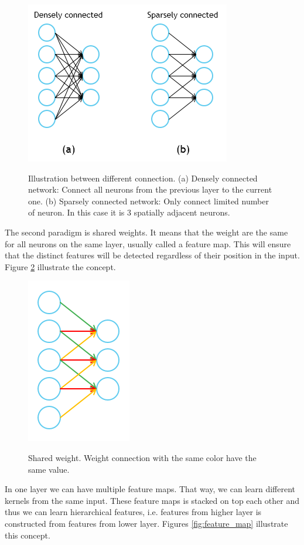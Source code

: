 \documentclass[a4paper,11pt]{kth-mag}
\begin{document}
\begin{figure}[h]
\centering
\includegraphics[scale=0.5]{image/sparse.png}
\label{fig:sparse}
\caption{Illustration between different connection. (a) Densely connected network: Connect all neurons from the previous layer to the current one. (b) Sparsely connected network: Only connect limited number of neuron. In this case it is 3 spatially adjacent neurons.}
\end{figure}

The second paradigm is shared weights. It means that the weight are the same for all neurons on the same layer, usually called a feature map. This will ensure that the distinct features will be detected regardless of their position in the input. Figure \ref{fig:shared} illustrate the concept. 

\begin{figure}
\centering
\includegraphics[scale=0.5]{image/shared.png}
\label{fig:shared}
\caption{Shared weight. Weight connection with the same color have the same value.}
\end{figure}

In one layer we can have multiple feature maps. That way, we can learn different kernels from the same input. These feature maps is stacked on top each other and thus we can learn hierarchical features, i.e. features from higher layer is constructed from features from lower layer. Figures \ref{fig:feature_map} illustrate this concept.
\end{document}
